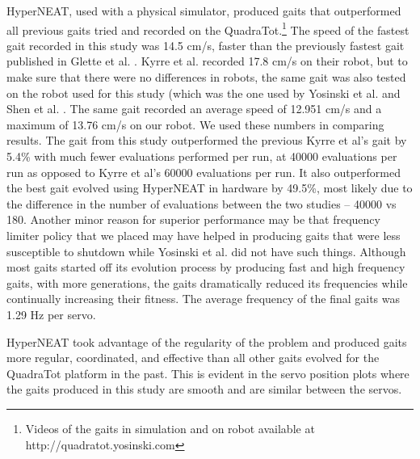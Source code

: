 HyperNEAT, used with a physical simulator, produced gaits that outperformed all previous gaits tried and recorded on the QuadraTot.\footnote{Videos of the gaits in simulation and on robot available at http://quadratot.yosinski.com}
The speed of the fastest gait recorded in this study was 14.5 cm/s, faster than the previously fastest gait published in Glette et al. \cite{glette}. 
Kyrre et al. \cite{glette} recorded 17.8 cm/s on their robot, but to make sure that there were no differences in robots, the same gait was also tested on the robot used for this study (which was the one used by Yosinski et al. \cite{yos:clune} and Shen et al. \cite{haocheng}. 
The same gait recorded an average speed of 12.951 cm/s and a maximum of 13.76 cm/s on our robot. We used these numbers in comparing results. 
The gait from this study outperformed the previous Kyrre et al's \cite{glette} gait by 5.4\% with much fewer evaluations performed per run, at 40000 evaluations per run as opposed to Kyrre et al's \cite{glette} 60000 evaluations per run.
It also outperformed the best gait evolved using HyperNEAT in hardware \cite{yos:clune} by 49.5\%, most likely due to the difference in the number of evaluations between the two studies -- 40000 vs 180. 
Another minor reason for superior performance may be that frequency limiter policy that we placed may have helped in producing gaits that were less susceptible to shutdown while Yosinski et al. \cite{yos:clune} did not have such things.
Although most gaits started off its evolution process by producing fast and high frequency gaits, with more generations, the gaits dramatically reduced its frequencies while continually increasing their fitness. The average frequency of the final gaits was 1.29 Hz per servo. 

HyperNEAT took advantage of the regularity of the problem and produced gaits more regular, coordinated, and effective than all other gaits evolved for the QuadraTot platform in the past.
This is evident in the servo position plots where the gaits produced in this study are smooth and are similar between the servos. 

